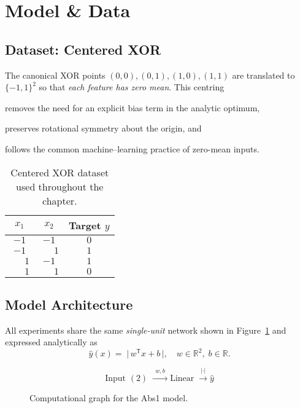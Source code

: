 ﻿%
\section{Model \& Data}
\label{sec:abs1-model-data}

\subsection*{Dataset: Centered XOR}
The canonical XOR points \((0,0),(0,1),(1,0),(1,1)\) are translated to
\(\{-1,1\}^2\) so that \emph{each feature has zero mean}.  
This centring

\begin{enumerate*}[label=(\roman*)]
  \item removes the need for an explicit bias term in the analytic optimum,
  \item preserves rotational symmetry about the origin, and
  \item follows the common machine–learning practice of zero-mean inputs.
\end{enumerate*}

\begin{table}[h]
\centering
\caption{Centered XOR dataset used throughout the chapter.}
\label{tab:xor-data}
\begin{tabular}{@{}cc|c@{}}\toprule
$x_1$ & $x_2$ & Target $y$ \\ \midrule
$-1$ & $-1$ & $0$ \\
$-1$ & $\;\phantom{-}1$ & $1$ \\
$\;\phantom{-}1$ & $-1$ & $1$ \\
$\;\phantom{-}1$ & $\;\phantom{-}1$ & $0$ \\ \bottomrule
\end{tabular}
\end{table}

\subsection*{Model Architecture}
All experiments share the same \emph{single-unit} network shown in
Figure~\ref{fig:model-graph} and expressed analytically as
\begin{equation}
    \hat y(x)
    =\;
    \bigl\lvert\,w^{\mathsf T}x + b\,\bigr\rvert,
    \quad
    w \in \mathbb{R}^{2},\;
    b \in \mathbb{R}.
    \label{eq:abs1}
\end{equation}

\begin{figure}[h]
\centering
\[
    \text{Input }(2)
    \;\xrightarrow{\;\,w,b\,\;}
    \text{Linear}
    \;\xrightarrow{\;|\cdot|\;}
    \hat y
\]
\caption{Computational graph for the Abs1 model.}
\label{fig:model-graph}
\end{figure}

